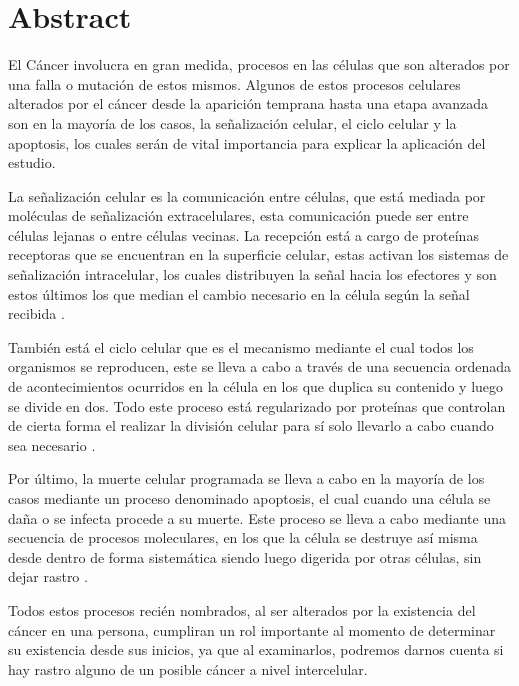 \documentclass[12pt, letterpaper]{article}
\begin{document}
\newpage

\tableofcontents

\newpage

\section{Abstract}
El Cáncer involucra en gran medida, procesos en las células que son alterados por una falla o mutación de estos mismos. Algunos de estos procesos celulares alterados por el cáncer desde la aparición temprana hasta una etapa avanzada son en la mayoría de los casos, la señalización celular, el ciclo celular y la apoptosis, los cuales serán de vital importancia para explicar la aplicación del estudio. 

La señalización celular es la comunicación entre células, que está mediada por moléculas de señalización extracelulares, esta comunicación puede ser entre células lejanas o entre células vecinas. La recepción está a cargo de proteínas receptoras que se encuentran en la superficie celular, estas activan los sistemas de señalización intracelular, los cuales distribuyen la señal hacia los efectores y son estos últimos los que median el cambio necesario en la célula según la señal recibida \autocite[p.~879]{albertsBiologiaMolecularCelula2010}.

También está el ciclo celular que es el mecanismo mediante el cual todos los organismos se reproducen, este se lleva a cabo a través de una secuencia ordenada de acontecimientos ocurridos en la célula en los que duplica su contenido y luego se divide en dos. Todo este proceso está regularizado por proteínas que controlan de cierta forma el realizar la división celular para sí solo llevarlo a cabo cuando sea necesario \autocite[p.~1053]{albertsBiologiaMolecularCelula2010}.

Por último, la muerte celular programada se lleva a cabo en la mayoría de los casos mediante un proceso denominado apoptosis, el cual cuando una célula se daña o se infecta procede a su muerte. Este proceso se lleva a cabo mediante una secuencia de procesos moleculares, en los que la célula se destruye así misma desde dentro de forma sistemática siendo luego digerida por otras células, sin dejar rastro \autocite[p.~1115]{albertsBiologiaMolecularCelula2010}.

Todos estos procesos recién nombrados, al ser alterados por la existencia del cáncer en una persona, cumpliran un rol importante al momento de determinar su existencia desde sus inicios, ya que al examinarlos, podremos darnos cuenta si hay rastro alguno de un posible cáncer a nivel intercelular.
\end{document}
